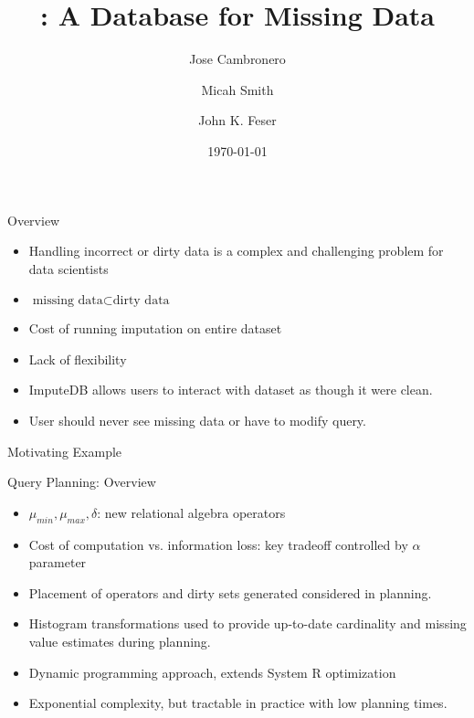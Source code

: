 \documentclass{beamer}
\title{\ProjectName{}: A Database for Missing Data}
\author{Jose Cambronero \and Micah Smith \and John K. Feser}
\institute{MIT}
\date{\today{}}
\newcommand{\ProjectName}{ImputeDB}
\begin{document}
\frame{\titlepage}

\begin{frame}{Overview}
\begin{itemize}
	\item Handling incorrect or dirty data is a complex and challenging problem for data scientists
	\item $\text{missing data} \subset \text{dirty data}$
	\item Cost of running imputation on entire dataset
	\item Lack of flexibility
	\item \ProjectName{} allows users to interact with dataset as though it were clean.
	\item User should never see missing data or have to modify query.
\end{itemize}
\end{frame}

\begin{frame}[fragile]{Motivating Example}
\end{frame}

\begin{frame}[fragile]{Query Planning: Overview}
\begin{itemize}
	\item $\mu_{min}, \mu_{max}, \delta$: new relational algebra operators
	\item Cost of computation vs. information loss: key tradeoff controlled by $\alpha$ parameter
	\item Placement of operators and dirty sets generated considered in planning.
	\item Histogram transformations used to provide up-to-date cardinality and missing value estimates during planning.
	\item Dynamic programming approach, extends System R optimization\cite{blasgen1981system}
	\item Exponential complexity, but tractable in practice with low planning times.
\end{itemize}
\end{frame}
\end{document}

